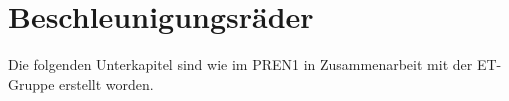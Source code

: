 \section{Beschleunigungsräder}

Die folgenden Unterkapitel sind wie im PREN1 in Zusammenarbeit mit der ET-Gruppe erstellt worden.


